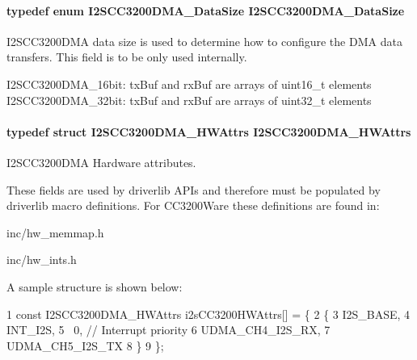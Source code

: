 \paragraph[{I2\+S\+C\+C3200\+D\+M\+A\+\_\+\+Data\+Size}]{\setlength{\rightskip}{0pt plus 5cm}typedef enum {\bf I2\+S\+C\+C3200\+D\+M\+A\+\_\+\+Data\+Size}  {\bf I2\+S\+C\+C3200\+D\+M\+A\+\_\+\+Data\+Size}}\label{_i2_s_c_c3200_d_m_a_8h_a5ab45b86872218ae89700bf004660b8f}


I2\+S\+C\+C3200\+D\+M\+A data size is used to determine how to configure the D\+M\+A data transfers. This field is to be only used internally. 

I2\+S\+C\+C3200\+D\+M\+A\+\_\+16bit\+: tx\+Buf and rx\+Buf are arrays of uint16\+\_\+t elements I2\+S\+C\+C3200\+D\+M\+A\+\_\+32bit\+: tx\+Buf and rx\+Buf are arrays of uint32\+\_\+t elements 
\paragraph[{I2\+S\+C\+C3200\+D\+M\+A\+\_\+\+H\+W\+Attrs}]{\setlength{\rightskip}{0pt plus 5cm}typedef struct {\bf I2\+S\+C\+C3200\+D\+M\+A\+\_\+\+H\+W\+Attrs}  {\bf I2\+S\+C\+C3200\+D\+M\+A\+\_\+\+H\+W\+Attrs}}\label{_i2_s_c_c3200_d_m_a_8h_ade664e865841159858d62f74344c10e1}


I2\+S\+C\+C3200\+D\+M\+A Hardware attributes. 

These fields are used by driverlib A\+P\+Is and therefore must be populated by driverlib macro definitions. For C\+C3200\+Ware these definitions are found in\+:
\begin{DoxyItemize}
\item inc/hw\+\_\+memmap.\+h
\item inc/hw\+\_\+ints.\+h
\end{DoxyItemize}

A sample structure is shown below\+: 
\begin{DoxyCode}
1 const I2SCC3200DMA\_HWAttrs i2sCC3200HWAttrs[] = \{
2     \{
3         I2S\_BASE,
4         INT\_I2S,
5         ~0,                 // Interrupt priority
6         UDMA\_CH4\_I2S\_RX,
7         UDMA\_CH5\_I2S\_TX
8     \}
9 \};
\end{DoxyCode}
